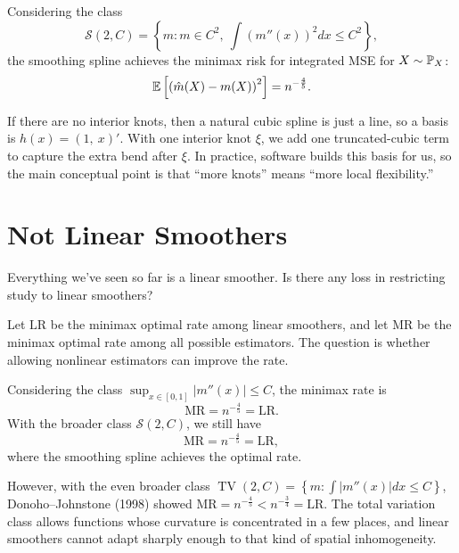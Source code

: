 Considering the class  \[
		\mathscr{S}(2,C) = \left\{m : m \in C^2, \ \int \left( m''(x) \right)^2 dx \le C^2\right\}
	,\] the smoothing spline achieves the minimax risk for integrated MSE for $X \sim \P_X$: \[
		\E\left[\left(\hat{m}(X) - m(X)\right)^2\right] = n^{-\frac{4}{5}}
.\] 
\begin{example}
	If there are no interior knots, then a natural cubic spline is just a line, so a basis is $h(x) = (1,\ x)'$. With one interior knot $\xi$, we add one truncated-cubic term to capture the extra bend after $\xi$. In practice, software builds this basis for us, so the main conceptual point is that ``more knots'' means ``more local flexibility.''
\end{example}

\section{Not Linear Smoothers}

Everything we've seen so far is a linear smoother. Is there any loss in restricting study to linear smoothers?

Let $\text{LR}$ be the minimax optimal rate among linear smoothers, and let $\text{MR}$ be the minimax optimal rate among all possible estimators. The question is whether allowing nonlinear estimators can improve the rate.
 
Considering the class $\sup_{x \in [0,1]} \left| m''(x) \right| \le C$, the minimax rate is
\[
	\text{MR} = n^{-\frac{4}{5}} = \text{LR}.
\]
With the broader class $\mathscr{S}(2,C)$, we still have
\[
	\text{MR} = n^{-\frac{4}{5}} = \text{LR},
\]
where the smoothing spline achieves the optimal rate.

However, with the even broader class $\operatorname{TV}(2,C) = \left\{m: \int \left| m''(x) \right|dx \le C\right\}$, Donoho--Johnstone (1998) showed $\text{MR} = n^{-\frac{4}{5}} < n^{-\frac{3}{4}} = \text{LR}$. The total variation class allows functions whose curvature is concentrated in a few places, and linear smoothers cannot adapt sharply enough to that kind of spatial inhomogeneity.

